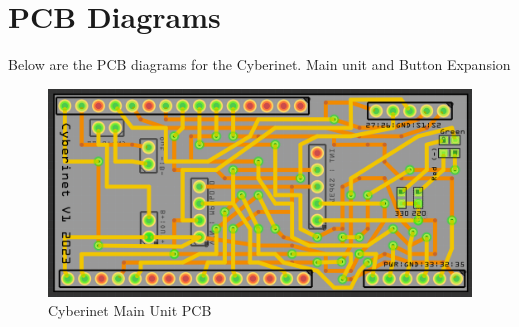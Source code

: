 \section{PCB Diagrams}
Below are the PCB diagrams for the Cyberinet. Main unit and Button Expansion


\begin{center}
\begin{figure}
    \centering
    \includegraphics[scale=0.3]{diagrams/PCBs/mainBoard.png}
    \caption{Cyberinet Main Unit PCB}
    \label{fig:mainPCB}
\end{figure}
\end{center}








